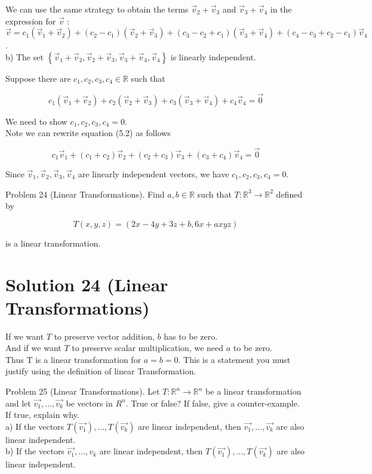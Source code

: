\documentclass[10pt]{article}
\begin{document}
We can use the same strategy to obtain the terms $\vec{v}_{2}+\vec{v}_{3}$ and $\vec{v}_{3}+\vec{v}_{4}$ in the expression for $\vec{v}$ :\\
$\vec{v}=c_{1}\left(\vec{v}_{1}+\vec{v}_{2}\right)+\left(c_{2}-c_{1}\right)\left(\vec{v}_{2}+\vec{v}_{3}\right)+\left(c_{3}-c_{2}+c_{1}\right)\left(\vec{v}_{3}+\vec{v}_{4}\right)+\left(c_{4}-c_{3}+c_{2}-c_{1}\right) \vec{v}_{4}$.\\
b) The set $\left\{\vec{v}_{1}+\vec{v}_{2}, \vec{v}_{2}+\vec{v}_{3}, \vec{v}_{3}+\vec{v}_{4}, \vec{v}_{4}\right\}$ is linearly independent.

Suppose there are $c_{1}, c_{2}, c_{3}, c_{4} \in \mathbb{R}$ such that


\begin{equation*}
c_{1}\left(\vec{v}_{1}+\vec{v}_{2}\right)+c_{2}\left(\vec{v}_{2}+\vec{v}_{3}\right)+c_{3}\left(\vec{v}_{3}+\vec{v}_{4}\right)+c_{4} \vec{v}_{4}=\overrightarrow{0} \tag{5.2}
\end{equation*}


We need to show $c_{1}, c_{2}, c_{3}, c_{4}=0$.\\
Note we can rewrite equation (5.2) as follows

$$
c_{1} \vec{v}_{1}+\left(c_{1}+c_{2}\right) \vec{v}_{2}+\left(c_{2}+c_{3}\right) \vec{v}_{3}+\left(c_{3}+c_{4}\right) \vec{v}_{4}=\overrightarrow{0}
$$

Since $\vec{v}_{1}, \vec{v}_{2}, \vec{v}_{3}, \vec{v}_{4}$ are linearly independent vectors, we have $c_{1}, c_{2}, c_{3}, c_{4}=0$.

Problem 24 (Linear Transformations). Find $a, b \in \mathbb{R}$ such that $T: \mathbb{R}^{3} \rightarrow \mathbb{R}^{2}$ defined by

$$
T(x, y, z)=(2 x-4 y+3 z+b, 6 x+a x y z)
$$

is a linear transformation.

\section*{Solution 24 (Linear Transformations)}
If we want $T$ to preserve vector addition, $b$ has to be zero.\\
And if we want $T$ to preserve scalar multiplication, we need $a$ to be zero.\\
Thus T is a linear transformation for $a=b=0$. This is a statement you must justify using the definition of linear Transformation.

Problem 25 (Linear Transformations). Let $T: \mathbb{R}^{n} \rightarrow \mathbb{R}^{n}$ be a linear transformation and let $\overrightarrow{v_{1}}, \ldots, \overrightarrow{v_{k}}$ be vectors in $R^{n}$. True or false? If false, give a counter-example. If true, explain why.\\
a) If the vectors $T\left(\overrightarrow{v_{1}}\right), \ldots, T\left(\overrightarrow{v_{k}}\right)$ are linear independent, then $\overrightarrow{v_{1}}, \ldots, \overrightarrow{v_{k}}$ are also linear independent.\\
b) If the vectors $\overrightarrow{v_{1}}, \ldots, v_{k}$ are linear independent, then $T\left(\overrightarrow{v_{1}}\right), \ldots, T\left(\overrightarrow{v_{k}}\right)$ are also linear independent.
\end{document}
